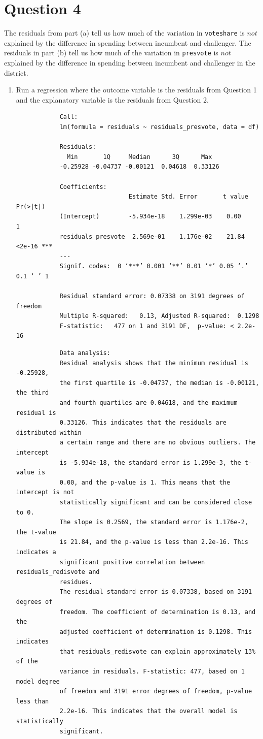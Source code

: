 \documentclass[12pt,letterpaper]{article}
\begin{document}
\section*{Question 4}
\noindent The residuals from part (a) tell us how much of the variation in \texttt{voteshare} is $not$ explained by the difference in spending between incumbent and challenger. The residuals in part (b) tell us how much of the variation in \texttt{presvote} is $not$ explained by the difference in spending between incumbent and challenger in the district.
	\begin{enumerate}
		\item Run a regression where the outcome variable is the residuals from Question 1 and the explanatory variable is the residuals from Question 2.	
		
		\begin{verbatim}
			Call:
			lm(formula = residuals ~ residuals_presvote, data = df)
			
			Residuals:
			  Min       1Q     Median      3Q      Max 
			-0.25928 -0.04737 -0.00121  0.04618  0.33126 
			
			Coefficients:
			                   Estimate Std. Error       t value  Pr(>|t|)    
			(Intercept)        -5.934e-18    1.299e-03    0.00        1    
			residuals_presvote  2.569e-01    1.176e-02    21.84   <2e-16 ***
			---
			Signif. codes:  0 ‘***’ 0.001 ‘**’ 0.01 ‘*’ 0.05 ‘.’ 0.1 ‘ ’ 1
			
			Residual standard error: 0.07338 on 3191 degrees of freedom
			Multiple R-squared:   0.13,	Adjusted R-squared:  0.1298 
			F-statistic:   477 on 1 and 3191 DF,  p-value: < 2.2e-16
		\end{verbatim}
		\begin{verbatim}
			Data analysis:
			Residual analysis shows that the minimum residual is -0.25928, 
			the first quartile is -0.04737, the median is -0.00121, the third 
			and fourth quartiles are 0.04618, and the maximum residual is 
			0.33126. This indicates that the residuals are distributed within 
			a certain range and there are no obvious outliers. The intercept 
			is -5.934e-18, the standard error is 1.299e-3, the t-value is 
			0.00, and the p-value is 1. This means that the intercept is not 
			statistically significant and can be considered close to 0.
			The slope is 0.2569, the standard error is 1.176e-2, the t-value 
			is 21.84, and the p-value is less than 2.2e-16. This indicates a 
			significant positive correlation between residuals_redisvote and 
			residues.
			The residual standard error is 0.07338, based on 3191 degrees of 
			freedom. The coefficient of determination is 0.13, and the 
			adjusted coefficient of determination is 0.1298. This indicates 
			that residuals_redisvote can explain approximately 13% of the 
			variance in residuals. F-statistic: 477, based on 1 model degree 
			of freedom and 3191 error degrees of freedom, p-value less than 
			2.2e-16. This indicates that the overall model is statistically 
			significant.
			

\end{verbatim}
\end{enumerate}
\end{document}
